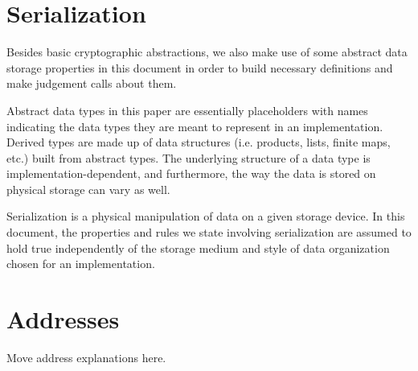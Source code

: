 \documentclass[11pt,a4paper,dvipsnames]{article}
\theoremstyle{definition}
\theoremstyle{definition}
\begin{document}
\clearpage

\section{Serialization}
\label{sec:serialization}


Besides basic cryptographic abstractions, we also make use of some abstract
data storage properties in this document in order to build necessary definitions
and make judgement calls about them.

Abstract data types in this paper are essentially placeholders with names
indicating the data types they are meant to represent in an implementation.
Derived types are made up of data structures (i.e. products, lists, finite
maps, etc.) built from abstract types. The underlying structure of a data type
is implementation-dependent, and furthermore, the way the data is stored on
physical storage can vary as well.

Serialization is a physical manipulation of data on a given storage device.
In this document, the properties and rules we state involving serialization are
assumed to hold true independently of the storage medium and style of data
organization chosen for an implementation.

\clearpage

\section{Addresses}
\label{sec:addresses}

\begin{todo}
Move address explanations here.
\end{todo}
\end{document}

